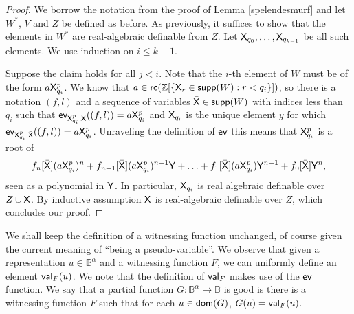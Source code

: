 \documentclass{amsart}
\renewcommand{\leq}{\leqslant}
\newcommand{\X}{{\sf X}}
\newcommand{\Y}{{\sf Y}}
\newcommand{\rc}{{\sf rc}}
\begin{document}
 \begin{proof}
     We borrow the notation from the proof of 
    Lemma \ref{spelendesmurf} and let $W^*$, $V$ and $Z$ be defined as 
    before.
    As previously, it suffices to show that the elements in $W^*$ are real-algebraic definable from $Z$. Let 
    $\X_{q_0}, \ldots, \X_{q_{k-1}}$ be all such elements. We use induction on $i\leq k-1$. 

    Suppose the claim holds for all $j<i$. Note that the $i$-th element of $W$ must be of the 
    form $a\X_{q_i}^p$. We know that $a\in \rc(\mathbb{Z}[\{\X_r\in {\sf supp}(W) : r<q_i\}])$, 
    so there is a notation $(f,l)$ and a sequence of variables $\bar{\X}\in {\sf supp}(W)$ with 
    indices less than $q_i$ such that ${\sf ev}_{\X_{q_i}^p, \bar{\X}}((f,l)) = a\X_{q_i}^p$ 
    and $\X_{q_i}$ is the unique element $y$ for which ${\sf ev}_{\X_{q_i}^p, \bar{\X}}((f,l)) = a\X_{q_i}^p$. 
    Unraveling the definition of ${\sf ev}$ this means that $\X_{q_i}^p$ is a root of
    \[f_n[\bar{\X}] (a\X_{q_i}^p)^n + f_{n-1}[\bar{\X}](a\X_{q_i}^p)^{n-1}\Y + \ldots + f_1[\bar{\X}](a\X_{q_i}^p)\Y^{n-1} + f_0[\bar{\X}]\Y^{n},\]
    seen as a polynomial in $\Y$. In particular, $\X_{q_i}$ is real algebraic definable over $Z\cup \bar{\X}$. 
    By inductive assumption $\bar{\X}$ is real-algebraic definable over $Z$, which concludes our proof.
 \end{proof}

 We shall keep the definition of a witnessing function unchanged, of course given the current meaning of ``being a pseudo-variable''. 
 We observe that given a representation $u\in\mathbb{B}^{\alpha}$ and a witnessing function $F$, we can uniformly define an element ${\sf val}_F(u)$. We note that the definition of ${\sf val}_F$ makes use of the ${\sf ev}$ function. We say that a partial function $G: \mathbb{B}^{\alpha}\rightarrow \mathbb{B}$ is good is there is a witnessing function $F$ such that for each $u\in{\sf dom}(G)$, $G(u) = {\sf val}_F(u).$
\end{document}
